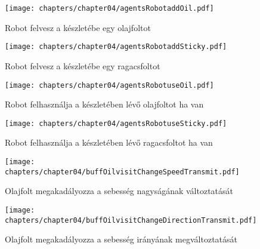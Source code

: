 \begin{figure}[h]
	\begin{center}
		\texttt{[image: chapters/chapter04/agentsRobotaddOil.pdf]}
		\caption{Robot felvesz a készletébe egy olajfoltot}
		\label{fig:agents.Robot.addOil}
	\end{center}
\end{figure}

\begin{figure}[h]
	\begin{center}
		\texttt{[image: chapters/chapter04/agentsRobotaddSticky.pdf]}
		\caption{Robot felvesz a készletébe egy ragacsfoltot}
		\label{fig:agents.Robot.addSticky}
	\end{center}
\end{figure}

\begin{figure}[h]
	\begin{center}
		\texttt{[image: chapters/chapter04/agentsRobotuseOil.pdf]}
		\caption{Robot felhasználja a készletében lévő olajfoltot ha van}
		\label{fig:agents.Robot.useOil}
	\end{center}
\end{figure}

\begin{figure}[h]
	\begin{center}
		\texttt{[image: chapters/chapter04/agentsRobotuseSticky.pdf]}
		\caption{Robot felhasználja a készletében lévő ragacsfoltot ha van}
		\label{fig:agents.Robot.useSticky}
	\end{center}
\end{figure}

\begin{figure}[h]
	\begin{center}
		\texttt{[image: chapters/chapter04/buffOilvisitChangeSpeedTransmit.pdf]}
		\caption{Olajfolt megakadályozza a sebesség nagyságának változtatását}
		\label{fig:buff.Oil.visit}
	\end{center}
\end{figure}

\begin{figure}[h]
	\begin{center}
		\texttt{[image: chapters/chapter04/buffOilvisitChangeDirectionTransmit.pdf]}
		\caption{Olajfolt megakadályozza a sebesség irányának megváltoztatását}
		\label{fig:buff.Oil.visit2}
	\end{center}
\end{figure}

